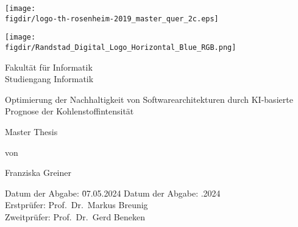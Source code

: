 \begin{titlepage}

\sffamily

\begin{flushright}

\vspace*{-2cm}

\texttt{[image: \\figdir/logo-th-rosenheim-2019\_master\_quer\_2c.eps]}

\end{flushright}
\begin{flushleft}

\vspace*{-2cm}

\texttt{[image: \\figdir/Randstad\_Digital\_Logo\_Horizontal\_Blue\_RGB.png]}
\end{flushleft}

\vfill

\centering
\LARGE
Fakultät für Informatik  \vspace{0.5cm}\\
\Large
Studiengang Informatik

\vspace{2cm}

\LARGE

Optimierung der Nachhaltigkeit von Softwarearchitekturen durch KI-basierte Prognose der Kohlenstoffintensität

\vspace{2cm}

\Large
Master Thesis

\vspace{1.5cm}


\Large
von

\vspace{0.5cm}


\LARGE
Franziska Greiner \vspace{1cm}

\vspace{1cm}

\flushleft
 \Large
\vspace*{\fill}

\begin{tabbing}
Datum der Abgabe: \= 07.05.2024 \kill
Datum der Abgabe: .2024 \\
Erstprüfer: \> Prof.\ Dr.\ Markus Breunig\\
Zweitprüfer: \> Prof.\ Dr.\ Gerd Beneken
\end{tabbing}

\vspace{1cm}
\centering
\small


\end{titlepage}

